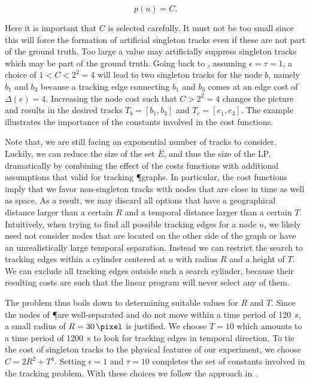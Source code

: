 		\begin{equation}
		p(u) = C.
		\end{equation}

		Here it is important that $C$ is selected carefully. It must not be too small since this will force the formation of artificial singleton tracks even if these are not part of the ground truth. Too large a value may artificially suppress singleton tracks which may be part of the ground truth. Going back to , assuming $\epsilon = \tau = 1$, a choice of $ 1 < C < 2^2 = 4$ will lead to two singleton tracks for the node $b$, namely ${b_1}$ and ${b_3}$ because a tracking edge connecting $b_1$ and $b_3$ comes at an edge cost of $\Delta(e)=4$. Increasing the node cost such that $C>2^2 = 4$ changes the picture and results in the desired tracks $T_b = [b_1, b_3]$ and $T_e = [e_1, e_3]$. The example illustrates the importance of the constants involved in the cost functions.

		Note that, we are still facing an exponential number of tracks to consider. Luckily, we can reduce the size of the set $\bar{E}$, and thus the size of the LP, dramatically by combining the effect of the costs functions with additional assumptions that valid for tracking \P graphs. In particular, the cost functions imply that we favor non-singleton tracks with nodes that are close in time as well as space. As a result, we may discard all options that have a geographical distance larger than a certain $R$ and a temporal distance larger than a certain $T$. Intuitively, when trying to find all possible tracking edges for a node $u$, we likely need not consider nodes that are located on the other side of the graph or have an unrealistically large temporal separation. Instead we can restrict the search to tracking edges within a cylinder centered at $u$ with radius $R$ and a height of $T$. We can exclude all tracking edges outside such a search cylinder, because their resulting costs are such that the linear program will never select any of them. 

		The problem thus boils down to determining suitable values for $R$ and $T$. Since the nodes of \P are well-separated and do not move within a time period of \SI{120}{\second}, a small radius of $R = \SI{30}{\pixel}$ is justified. We choose $T = 10$ which amounts to a time period of \SI{1200}{\second} to look for tracking edges in temporal direction. To tie the cost of singleton tracks to the physical features of our experiment, we choose $ C = 2 R^2 + T^4$. Setting $\epsilon =1$ and $\tau = 10$ completes the set of constants involved in the tracking problem. With these choices we follow the approach in~\cite{Karrenbauer2013}.

